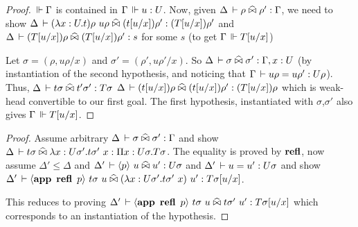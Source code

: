 \documentclass[a4paper,english]{lipics-utf8x}
\begin{document}
  \begin{proof}
    $\,\Vdash \Gamma$ is contained in $\Gamma \,\Vdash u : U$.
    Now, given $\Delta \,\vdash \rho \mathrel{\widehat{\bowtie}} \rho' : \Gamma$, we need to show
    $\Delta \,\vdash (\lambda x:U.t)\rho\ u\rho \mathrel{\widehat{\bowtie}} (t[u/x])\rho' : (T[u/x])\rho'$
    and $\Delta \,\vdash (T[u/x])\rho \mathrel{\widehat{\bowtie}} (T[u/x])\rho' : s$ for some $s$
    (to get $\Gamma \,\Vdash T[u/x]$)

    Let $\sigma = (\rho, u \rho/x)$ and $\sigma' = (\rho', u \rho'/x)$.
    So $\Delta \,\vdash \sigma \mathrel{\widehat{\bowtie}} \sigma' : \Gamma, x:U$ (by instantiation of the
    second hypothesis, and noticing that $\Gamma \,\vdash u\rho = u\rho' : U\rho$).
    Thus, $\Delta \,\vdash t \sigma \mathrel{\widehat{\bowtie}} t' \sigma' : T\sigma$
    \ie $\Delta \,\vdash (t[u/x])\rho \mathrel{\widehat{\bowtie}} (t[u/x])\rho' : (T[u/x])\rho$
    which is weak-head convertible to our first goal.
    The first hypothesis, instantiated with $\sigma$,$\sigma'$ also gives
    $\Gamma \,\Vdash T[u/x]$.
  \end{proof}

  \begin{lemma}
    \leavevmode
    \begin{mathc}
    \end{mathc}
  \end{lemma}

  \begin{proof}
    Assume arbitrary $\Delta \,\vdash \sigma \mathrel{\widehat{\bowtie}} \sigma' : \Gamma$ and show
    $\Delta \,\vdash t \sigma \mathrel{\widehat{\bowtie}} \lambda x:U\sigma'. t\sigma'\ x :
    \Pi x:U\sigma.T\sigma$.
    The equality is proved by $\operatorname{\mathbf{refl}}$, now assume $\Delta' \le \Delta$
    and $\Delta' \,\vdash \langle p \rangle~ u \mathrel{\widehat{\bowtie}} u' : U\sigma$
    and $\Delta' \,\vdash u = u' : U \sigma$
    and show
    $\Delta' \,\vdash \langle \operatorname{\mathbf{app}~} \operatorname{\mathbf{refl}}\ p \rangle~ t\sigma\ u \mathrel{\widehat{\bowtie}}
    (\lambda x:U\sigma'. t\sigma'\ x)\ u' : T\sigma[u/x]$.

    This reduces to proving
    $\Delta' \,\vdash \langle \operatorname{\mathbf{app}~} \operatorname{\mathbf{refl}}\ p \rangle~ t\sigma\ u \mathrel{\widehat{\bowtie}} t \sigma'\ u' :
    T\sigma[u/x]$ which corresponds to an instantiation of the hypothesis.
  \end{proof}

  \begin{lemma}
    \leavevmode
    \begin{mathc}
    \end{mathc}
  \end{lemma}
\end{document}
